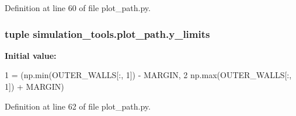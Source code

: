Definition at line 60 of file plot\+\_\+path.\+py.

\subsubsection[{\texorpdfstring{y\+\_\+limits}{y_limits}}]{\setlength{\rightskip}{0pt plus 5cm}tuple simulation\+\_\+tools.\+plot\+\_\+path.\+y\+\_\+limits}\hypertarget{namespacesimulation__tools_1_1plot__path_a7c4e9f4c49238053d939ab44ccc11f36}{}\label{namespacesimulation__tools_1_1plot__path_a7c4e9f4c49238053d939ab44ccc11f36}
{\bfseries Initial value\+:}
\begin{DoxyCode}
1 = (np.min(OUTER\_WALLS[:, 1]) - MARGIN,
2             np.max(OUTER\_WALLS[:, 1]) + MARGIN)
\end{DoxyCode}


Definition at line 62 of file plot\+\_\+path.\+py.

